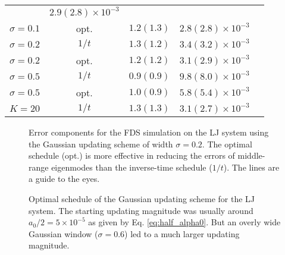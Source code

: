 \documentclass[reprint, superscriptaddress, floatfix]{revtex4-1}
\begin{document}
\begin{table}[h]
\begin{tabular} { l c c c c }
    & $2.9(2.8)\times10^{-3}$
    \\
    $\sigma=0.1$ & opt.
    & $1.2(1.3)$
    & $2.8(2.8)\times10^{-3}$
    \\
    $\sigma=0.2$ & $1/t$
    & $1.3(1.2)$
    & $3.4(3.2)\times10^{-3}$
    \\
    $\sigma=0.2$ & opt.
    & $1.2(1.2)$
    & $3.1(2.9)\times10^{-3}$
    \\
    $\sigma=0.5$ & $1/t$
    & $0.9(0.9)$
    & $9.8(8.0)\times10^{-3}$
    \\
    $\sigma=0.5$ & opt.
    & $1.0(0.9)$
    & $5.8(5.4)\times10^{-3}$
    \\
    $K=20$ & $1/t$
    & $1.3(1.3)$
    & $3.1(2.7)\times10^{-3}$
    \\
    \hline
  \end{tabular}
\end{table}



\begin{figure}[h]
\begin{center}
  \caption{
    \label{fig:lj_xerr}
    Error components for the FDS simulation on the LJ system
    using the Gaussian updating scheme of width $\sigma = 0.2$.
    The optimal schedule (opt.) is more effective
    in reducing the errors of middle-range eigenmodes
    than the inverse-time schedule ($1/t$).
    The lines are a guide to the eyes.
  }
\end{center}
\end{figure}



\begin{figure}[h]
\begin{center}
  \caption{
    \label{fig:lj_alpha}
    Optimal schedule of the Gaussian updating scheme
    for the LJ system.
    The starting updating magnitude was usually
    around $a_0/2 = 5\times10^{-5}$
    as given by Eq. \eqref{eq:half_alpha0}.
    But an overly wide Gaussian window ($\sigma = 0.6$)
    led to a much larger updating magnitude.
  }
\end{center}
\end{figure}
\end{document}
